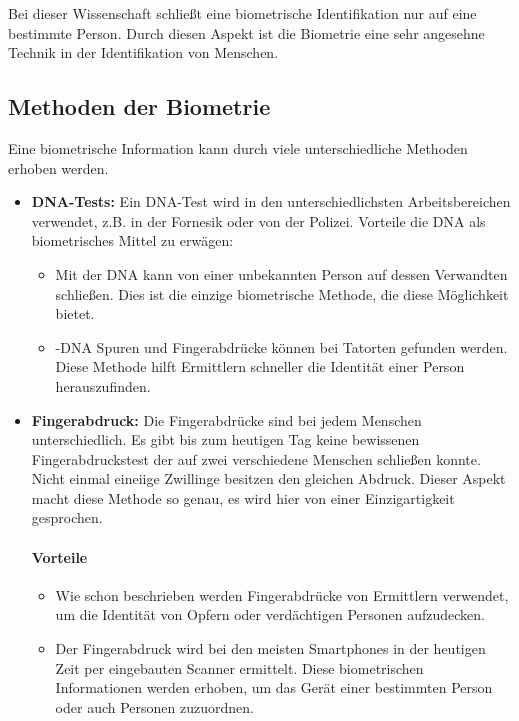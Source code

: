 Bei dieser Wissenschaft schließt eine biometrische Identifikation nur auf eine bestimmte Person.
Durch diesen Aspekt ist die Biometrie eine sehr angesehne Technik in der Identifikation von Menschen.

\subsection{Methoden der Biometrie}
Eine biometrische Information kann durch viele unterschiedliche Methoden erhoben werden.
\begin{itemize}
	\item \textbf{DNA-Tests:} Ein DNA-Test wird in den unterschiedlichsten Arbeitsbereichen verwendet, z.B. in der Fornesik oder von der Polizei.
	Vorteile die DNA als biometrisches Mittel zu erwägen:
	\begin{itemize}
		\item Mit der DNA kann von einer unbekannten Person auf dessen Verwandten schließen. Dies ist die einzige biometrische Methode, die diese Möglichkeit bietet.
		\item-DNA Spuren und Fingerabdrücke können bei Tatorten gefunden werden. Diese Methode hilft Ermittlern schneller die Identität einer Person herauszufinden.
	\end{itemize}
	\item \textbf{Fingerabdruck:} Die Fingerabdrücke sind bei jedem Menschen unterschiedlich. 
	Es gibt bis zum heutigen Tag keine bewissenen Fingerabdruckstest der auf zwei verschiedene Menschen schließen konnte. 
	Nicht einmal eineiige Zwillinge besitzen den gleichen Abdruck.
	Dieser Aspekt macht diese Methode so genau, es wird hier von einer Einzigartigkeit gesprochen.
	\paragraph{Vorteile}
	\begin{itemize}
		\item Wie schon beschrieben werden Fingerabdrücke von Ermittlern verwendet, um die Identität von Opfern oder verdächtigen Personen aufzudecken.
		\item Der Fingerabdruck wird bei den meisten Smartphones in der heutigen Zeit per eingebauten Scanner ermittelt. Diese biometrischen Informationen werden erhoben, um das Gerät einer bestimmten Person oder auch Personen zuzuordnen.
	\end{itemize}

\end{itemize}
